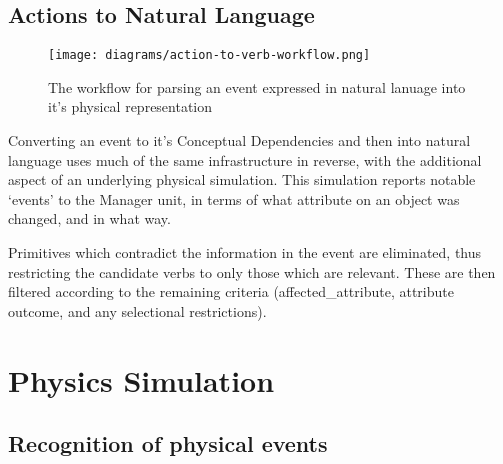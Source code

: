 \documentclass[dissertation.tex]{subfiles}
\begin{document}
    \subsection{Actions to Natural Language}
    \begin{figure}[h]
        \begin{center}        
            \texttt{[image: diagrams/action-to-verb-workflow.png]}
        \end{center}
        \caption{The workflow for parsing an event expressed in natural lanuage into it's physical representation}
    \end{figure}

    Converting an event to it's Conceptual Dependencies and then into natural language uses much of the same infrastructure in reverse, with the additional aspect of an underlying physical simulation. This simulation reports notable `events' to the Manager unit, in terms of what attribute on an object was changed, and in what way.

    Primitives which contradict the information in the event are eliminated, thus restricting the candidate verbs to only those which are relevant. These are then filtered according to the remaining criteria (affected\_attribute, attribute outcome, and any selectional restrictions).

    \section{Physics Simulation}
    \subsection{Recognition of physical events}
\end{document}
